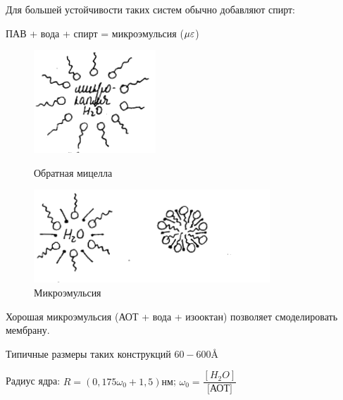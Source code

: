 \begin{lecture}
\begin{lecSection}
\begin{flushleft}
		\par Для большей устойчивости таких систем обычно добавляют спирт:
		\par ПАВ + вода + спирт = микроэмульсия ($\Large \mu \varepsilon \normalsize$)
			\begin{figure}[H]
			\begin{minipage}[h]{0.2\linewidth}
				\centering\includegraphics[width=\linewidth]{lecture_07/new_pic7}
				\caption{Обратная мицелла}
			\end{minipage}
			\hfill
			\begin{minipage}[h]{0.7\linewidth}
				\centering\includegraphics[width=\linewidth]{lecture_07/new_pic8}
				\caption{Микроэмульсия}
			\end{minipage}
			\hfill
			\end{figure}
		\par Хорошая микроэмульсия (АОТ + вода + изооктан) позволяет смоделировать мембрану.
		\par Типичные размеры таких конструкций $60-600\text{Å}$
		\par Радиус ядра: $R =  (0,175\omega_0 + 1,5)\text{нм}$; $\omega_0 = \dfrac{[H_2O]}{\text{[АОТ]}}$
	\end{flushleft}
	\end{lecSection}


\end{lecture}

